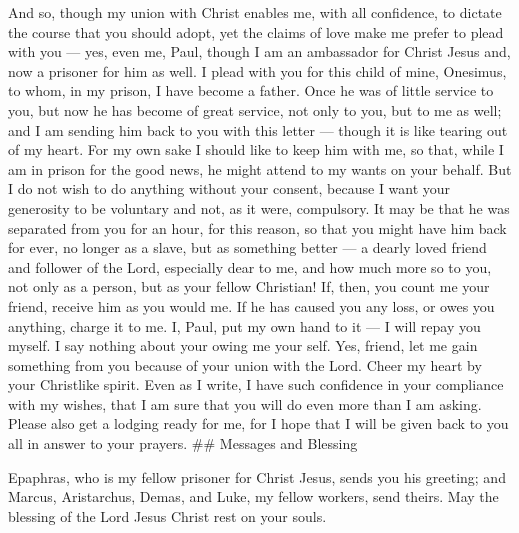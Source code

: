  And so, though my union with Christ enables me, with all
confidence, to dictate the course that you should adopt, 
yet the claims of love make me prefer to plead with you --- yes, even
me, Paul, though I am an ambassador for Christ Jesus and, now a prisoner
for him as well.  I plead with you for this child of mine,
Onesimus, to whom, in my prison, I have become a father. 
Once he was of little service to you, but now he has become of great
service, not only to you, but to me as well;  and I am
sending him back to you with this letter --- though it is like tearing
out of my heart.  For my own sake I should like to keep him
with me, so that, while I am in prison for the good news, he might
attend to my wants on your behalf.  But I do not wish to do
anything without your consent, because I want your generosity to be
voluntary and not, as it were, compulsory.  It may be that
he was separated from you for an hour, for this reason, so that you
might have him back for ever,  no longer as a slave, but as
something better --- a dearly loved friend and follower of the Lord,
especially dear to me, and how much more so to you, not only as a
person, but as your fellow Christian!  If, then, you count
me your friend, receive him as you would me.  If he has
caused you any loss, or owes you anything, charge it to me.
 I, Paul, put my own hand to it --- I will repay you
myself. I say nothing about your owing me your self.  Yes,
friend, let me gain something from you because of your union with the
Lord. Cheer my heart by your Christlike spirit.  Even as I
write, I have such confidence in your compliance with my wishes, that I
am sure that you will do even more than I am asking. 
Please also get a lodging ready for me, for I hope that I will be given
back to you all in answer to your prayers. \#\# Messages and Blessing

 Epaphras, who is my fellow prisoner for Christ Jesus,
sends you his greeting;  and Marcus, Aristarchus, Demas,
and Luke, my fellow workers, send theirs.  May the blessing
of the Lord Jesus Christ rest on your souls.
